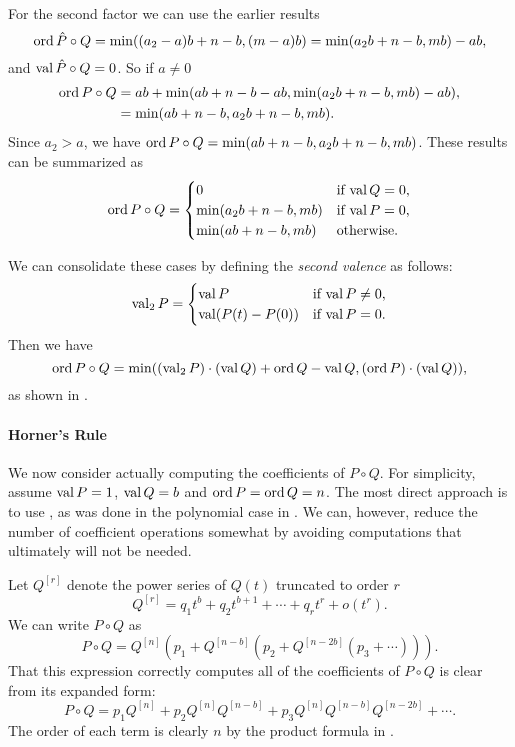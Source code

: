 For the second factor we can use the earlier results
\[
\mathop{\rm ord}\nolimits \hat{P} \circ Q = \min((a_2 - a)b + n - b, (m - a)b)
 = \min(a_2 b + n - b, mb) - ab,
\]
and $\mathop{\rm val}\nolimits \hat{P}\circ Q = 0$.  So if $a\not=0$
\[
\begin{aligned}
\mathop{\rm ord}\nolimits P \circ Q & =
ab + \min(ab + n - b - ab, \min(a_2 b + n - b, mb) - ab), \\
 & = \min(ab + n - b, a_2 b + n - b, mb).
\end{aligned}
\]
Since $a_2 > a$, we have $\mathop{\rm ord}\nolimits P \circ Q = \min(ab + n - b, a_2 b + n
- b, mb)$.  These results can be summarized as
\[
\mathop{\rm ord}\nolimits P\circ Q = 
\begin{cases}
0 & \mbox{if $\mathop{\rm val}\nolimits Q = 0$,} \\
\min(a_2 b + n - b, mb) & \mbox{if $\mathop{\rm val}\nolimits P = 0$,} \\
\min(a b + n - b, mb) & \mbox{otherwise.} 
\end{cases}
\]

We can consolidate these cases by defining the {\em second
valence} as follows:
\[
\mathop{\rm val}\nolimits_2 P = 
\begin{cases}
\mathop{\rm val}\nolimits P & \mbox{if $\mathop{\rm val}\nolimits P \not= 0$,} \\
\mathop{\rm val}\nolimits (P(t) - P(0)) & \mbox{if $\mathop{\rm val}\nolimits P = 0$.}
\end{cases}
\]
Then we have
\[
\mathop{\rm ord}\nolimits P \circ Q = \min((\mathop{\rm val}\nolimits_2 P) \cdot (\mathop{\rm val}\nolimits Q) + \mathop{\rm ord}\nolimits Q - \mathop{\rm val}\nolimits Q,
(\mathop{\rm ord}\nolimits P) \cdot (\mathop{\rm val}\nolimits Q)),
\]
as shown in .

\paragraph{Horner's Rule}

We now consider actually computing the coefficients of $P \circ Q$.
For simplicity, assume $\mathop{\rm val}\nolimits P = 1$, $\mathop{\rm val}\nolimits Q = b$ and $\mathop{\rm ord}\nolimits P = \mathop{\rm ord}\nolimits Q
= n$.  The most direct approach is to use , as was done in
the polynomial case in .  We can, however,
reduce the number of coefficient operations somewhat by avoiding
computations that ultimately will not be needed.

Let $Q^{[r]}$ denote the power series of $Q(t)$ truncated to order
$r$
\[
Q^{[r]} = q_1 t^b + q_2 t^{b+1} + \cdots + q_r t^r + o(t^r).
\]
We can write $P\circ Q$ as
\begin{equation} \label{FPS:Horners:Eq}
P\circ Q = Q^{[n]}(p_1 + Q^{[n-b]}(p_2 + Q^{[n-2b]}(p_3 + \cdots ))).
\end{equation}
That this expression correctly computes all of the coefficients of $P
\circ Q$ is clear from its expanded form:
\[
P\circ Q = p_1 Q^{[n]} + p_2 Q^{[n]} Q^{[n-b]} + p_3 Q^{[n]} Q^{[n-b]}
Q^{[n-2b]} + \cdots.
\]
The order of each term is clearly $n$ by the product formula in
.  

